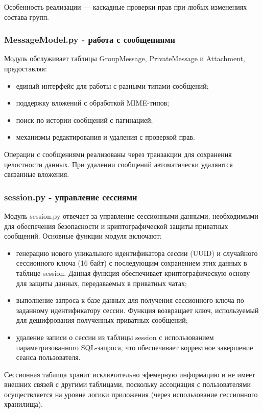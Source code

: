 Особенность реализации — каскадные проверки прав при любых изменениях состава групп.

\subsubsection{MessageModel.py - работа с сообщениями}
Модуль обслуживает таблицы GroupMessage, PrivateMessage и Attachment, предоставляя:
\begin{itemize}
	\item единый интерфейс для работы с разными типами сообщений;
	\item поддержку вложений с обработкой MIME-типов;
	\item поиск по истории сообщений с пагинацией;
	\item механизмы редактирования и удаления с проверкой прав.
\end{itemize}

Операции с сообщениями реализованы через транзакции для сохранения целостности данных. При удалении сообщений автоматически удаляются связанные вложения.

\subsubsection{session.py - управление сессиями}
Модуль session.py отвечает за управление сессионными данными, необходимыми для обеспечения безопасности и криптографической защиты приватных сообщений. Основные функции модуля включают:
\begin{itemize}
	\item генерацию нового уникального идентификатора сессии (UUID) и случайного сессионного ключа (16 байт) с последующим сохранением этих данных в таблице session. Данная функция обеспечивает криптографическую основу для защиты данных, передаваемых в приватных чатах;
	\item выполнение запроса к базе данных для получения сессионного ключа по заданному идентификатору сессии. Функция возвращает ключ, используемый для дешифрования полученных приватных сообщений;
	\item удаление записи о сессии из таблицы session с использованием параметризованного SQL-запроса, что обеспечивает корректное завершение сеанса пользователя.
\end{itemize}

Сессионная таблица хранит исключительно эфемерную информацию и не имеет внешних связей с другими таблицами, поскольку ассоциация с пользователями осуществляется на уровне логики приложения (через использование сессионного хранилища).

